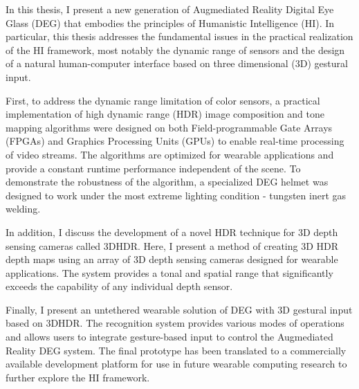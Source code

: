 In this thesis, I present a new generation of Augmediated Reality Digital Eye Glass (DEG) that embodies the principles of Humanistic Intelligence (HI).  In particular, this thesis addresses the fundamental issues in the practical realization of the HI framework, most notably the dynamic range of sensors and the design of a natural human-computer interface based on three dimensional (3D) gestural input.  

First, to address the dynamic range limitation of color sensors, a practical implementation of high dynamic range (HDR) image composition and tone mapping algorithms were designed on both Field-programmable Gate Arrays (FPGAs) and Graphics Processing Units (GPUs) to enable real-time processing of video streams. The algorithms are optimized for wearable applications and provide a constant runtime performance independent of the scene. To demonstrate the robustness of the algorithm, a specialized DEG helmet was designed to work under the most extreme lighting condition - tungsten inert gas welding. 

In addition, I discuss the development of a novel HDR technique for 3D depth sensing cameras called 3DHDR.  Here, I present a method of creating 3D HDR depth maps using an array of 3D depth sensing cameras designed for wearable applications. The system provides a tonal and spatial range that significantly exceeds the capability of any individual depth sensor. 
 
Finally, I present an untethered wearable solution of DEG with 3D gestural input based on 3DHDR. The recognition system provides various modes of operations and allows users to integrate gesture-based input to control the Augmediated Reality DEG system. The final prototype has been translated to a commercially available development platform for use in future wearable computing research to further explore the HI framework. 